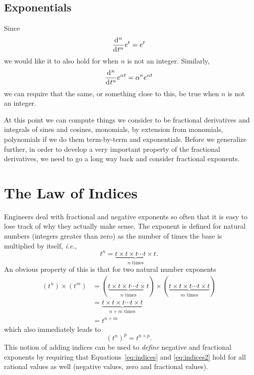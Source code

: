 \subsection{Exponentials}
Since
\begin{equation*}
  \frac{\operatorname{d}\hspace*{-1pt}^n}{\operatorname{d}\hspace*{-1pt} t^n}e^t = e^t
\end{equation*}
we would like it to also hold for when $n$ is not an integer.  Similarly, 
\begin{equation*}
  \frac{\operatorname{d}\hspace*{-1pt}^n}{\operatorname{d}\hspace*{-1pt} t^n} e^{\alpha t} = \alpha^n e^{\alpha t}
\end{equation*}
we can require that the same, or something close to this, be true when $n$ is not an integer.

At this point we can compute things we consider to be fractional derivatives and integrals of sines and cosines, monomials, by extension from monomials, polynomials if we do them term-by-term and exponentials.  Before we generalize further, in order to develop a very important property of the fractional derivatives, we need to go a long way back and consider fractional exponents.



\section{The Law of Indices}
\label{sec:indices}
Engineers deal with fractional and negative exponents so often that it is easy to lose track of why they actually make sense. The exponent is defined for natural numbers (integers greater than zero) as the number of times the base is multiplied by itself, \textit{i.e.},
\begin{equation}
  t^n = \underbrace{t \times t \times t \cdots t \times t}_{\mbox{$n$ times}}.
  \label{eq:power}
\end{equation}
An obvious property of this is that for two natural number exponents
\begin{align}
  \left(t^n\right) \times \left( t^m \right) &=  \left( \underbrace{t \times t \times t \cdots t \times t}_{\mbox{$n$ times}}
  \right) \times \left( \underbrace{t \times t \times t \cdots t \times t}_{\mbox{$m$ times}}
  \right) \\
  &= 
  \underbrace{t \times t \times t \cdots t \times t}_{\mbox{$n + m$ times}} \\
  &= t^{n + m}
  \label{eq:indices}
\end{align}
which also immediately leads to
\begin{equation}
  \left( t^n \right)^p = t^{n \times p}.
  \label{eq:indices2}
\end{equation}
This notion of adding indices can be used to \emph{define} negative and fractional exponents by requiring that Equations~\ref{eq:indices} and \ref{eq:indices2} hold for all rational values as well (negative values, zero and fractional values). 

